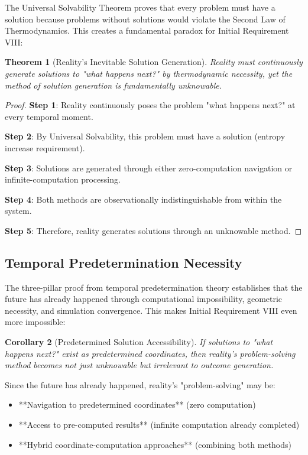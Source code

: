 \documentclass[12pt,a4paper]{article}
\newtheorem{theorem}{Theorem}[section]
\newtheorem{corollary}[theorem]{Corollary}
\begin{document}
The Universal Solvability Theorem proves that every problem must have a solution because problems without solutions would violate the Second Law of Thermodynamics. This creates a fundamental paradox for Initial Requirement VIII:

\begin{theorem}[Reality's Inevitable Solution Generation]
Reality must continuously generate solutions to "what happens next?" by thermodynamic necessity, yet the method of solution generation is fundamentally unknowable.
\end{theorem}

\begin{proof}
\textbf{Step 1}: Reality continuously poses the problem "what happens next?" at every temporal moment.

\textbf{Step 2}: By Universal Solvability, this problem must have a solution (entropy increase requirement).

\textbf{Step 3}: Solutions are generated through either zero-computation navigation or infinite-computation processing.

\textbf{Step 4}: Both methods are observationally indistinguishable from within the system.

\textbf{Step 5}: Therefore, reality generates solutions through an unknowable method.
\end{proof}

\subsection{Temporal Predetermination Necessity}

The three-pillar proof from temporal predetermination theory establishes that the future has already happened through computational impossibility, geometric necessity, and simulation convergence. This makes Initial Requirement VIII even more impossible:

\begin{corollary}[Predetermined Solution Accessibility]
If solutions to "what happens next?" exist as predetermined coordinates, then reality's problem-solving method becomes not just unknowable but irrelevant to outcome generation.
\end{corollary}

Since the future has already happened, reality's "problem-solving" may be:
\begin{itemize}
\item **Navigation to predetermined coordinates** (zero computation)
\item **Access to pre-computed results** (infinite computation already completed)
\item **Hybrid coordinate-computation approaches** (combining both methods)
\end{itemize}
\end{document}
